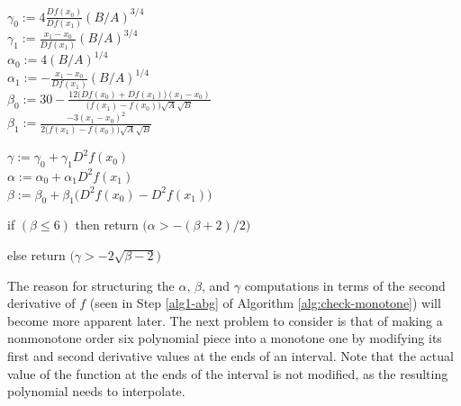 \documentclass{scspaperproc}
\theoremstyle{scsthe}
\begin{document}
{  \item $\displaystyle \gamma_0 := 4 \frac{Df(x_0)}{Df(x_1)} (B/A)^{3/4}$
    \\ $\displaystyle \gamma_1 := \frac{x_1 - x_0}{Df(x_1)} (B/A)^{3/4}$
    \\ $\alpha_0 := 4 (B/A)^{1/4}$
    \\ $\displaystyle \alpha_1 := -\frac{x_1 - x_0}{Df(x_1)} (B/A)^{1/4}$
    \\ $\displaystyle \beta_0 := 30 - \frac{12 \big(Df(x_0) + Df(x_1)\big) (x_1 - x_0)}{\big(f(x_1) - f(x_0)\big) \sqrt{A}\sqrt{B}}$
    \\ $\displaystyle \beta_1 := \frac{-3 (x_1 - x_0)^2}{2 \big(f(x_1) - f(x_0)\big) \sqrt{A} \sqrt{B}} $ \label{alg1-linearized-abg}
  \item $\gamma := \gamma_0 + \gamma_1 D^2f(x_0)$
    \\ $\alpha := \alpha_0 + \alpha_1 D^2f(x_1)$
    \\ $\beta := \beta_0 + \beta_1 \big(D^2f(x_0) - D^2f(x_1)\big)$
    \label{alg1-abg}
  \item if $(\beta \leq 6)$ then return $\big(\alpha > - (\beta + 2) / 2\big)$
  \item else return $\big(\gamma > -2 \sqrt{\beta - 2}\big)$ \label{alg1-last}
}

The reason for structuring the $\alpha$, $\beta$, and $\gamma$ computations in terms of the second derivative of $f$ (seen in Step \ref{alg1-abg} of Algorithm \ref{alg:check-monotone}) will become more apparent later. The next problem to consider is that of making a nonmonotone order six polynomial piece into a monotone one by modifying its first and second derivative values at the ends of an interval. Note that the actual value of the function at the ends of the interval is not modified, as the resulting polynomial needs to interpolate.
\end{document}
